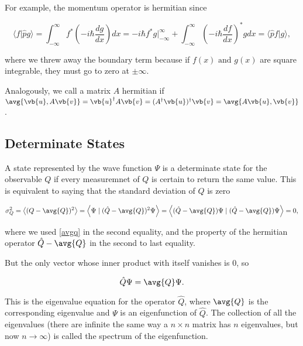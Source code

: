 \documentclass[a4paper,12pt]{report}
\begin{document}
For example, the momentum operator is hermitian since

\begin{equation}
  \langle f \vert \hat{p} g \rangle = \int_{-\infty}^\infty f^* \left( -i\hbar \frac{dg}{dx} \right) dx = -i\hbar f^* g \bigg|_{-\infty}^\infty + \int_{-\infty}^\infty \left( -i\hbar \frac{df}{dx} \right)^* g  dx = \langle \hat{p} f \vert g \rangle,
\end{equation}

where we threw away the boundary term because if \(f(x) \text { and } g(x)\) are square integrable, they must go to zero at \(\pm \infty\).

Analogously, we call a matrix \(A\) hermitian if \(\avg{\vb{u} , A\vb{v} } = \vb{u}^{\dagger} A\vb{v} = (A^{\dagger}\vb{u} )^{\dagger}\vb{v} = \avg{A\vb{u} , \vb{v} }\).

\subsection{Determinate States}

A state represented by the wave function \(\Psi \) is a determinate state for the observable \(Q\) if every measuremnet of \(Q\) is certain to return the same value. This is equivalent to saying that the standard deviation of \(Q\) is zero

\begin{equation}
  \sigma _{Q}^2 =  \left< (Q-\avg{Q} )^2 \right> = \left< \Psi \mid (\hat{Q} - \avg{Q} )^2 \Psi  \right> = \left< (\hat{Q} - \avg{Q} )\Psi \mid (\hat{Q} - \avg{Q} )\Psi  \right> =0, 
\end{equation}

where we used \cref{avgq} in the second equality, and the property of the hermitian operator \(\hat{Q} - \avg{Q} \) in the second to last equality.

But the only vector whose inner product with itself vanishes is 0, so

\begin{equation}
  \hat{Q} \Psi = \avg{Q}\Psi . 
\end{equation}

This is the eigenvalue equation for the operator \(\hat{Q} \), where \(\avg{Q} \) is the corresponding eigenvalue and \(\Psi \) is an eigenfunction of \(\hat{Q} \). The collection of all the eigenvalues (there are infinite the same way a \(n \times n\) matrix has \(n\) eigenvalues, but now \(n \to \infty\)) is called the spectrum of the eigenfunction.
\end{document}
